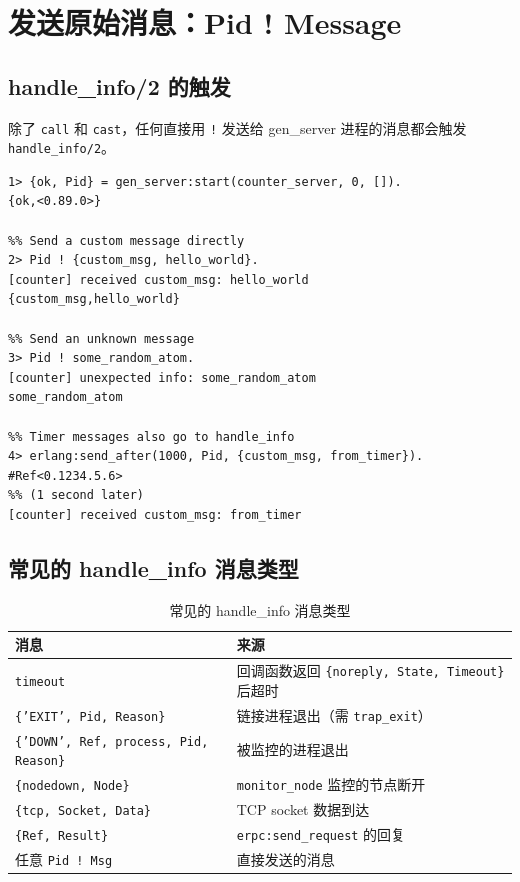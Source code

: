 \documentclass[a4paper,11pt]{article}
\begin{document}
\section{发送原始消息：Pid ! Message}

\subsection{handle\_info/2 的触发}

除了 \texttt{call} 和 \texttt{cast}，任何直接用 \texttt{!} 发送给 gen\_server 进程的消息都会触发 \texttt{handle\_info/2}。

\begin{lstlisting}[style=shellstyle, caption={直接发送消息}]
1> {ok, Pid} = gen_server:start(counter_server, 0, []).
{ok,<0.89.0>}

%% Send a custom message directly
2> Pid ! {custom_msg, hello_world}.
[counter] received custom_msg: hello_world
{custom_msg,hello_world}

%% Send an unknown message
3> Pid ! some_random_atom.
[counter] unexpected info: some_random_atom
some_random_atom

%% Timer messages also go to handle_info
4> erlang:send_after(1000, Pid, {custom_msg, from_timer}).
#Ref<0.1234.5.6>
%% (1 second later)
[counter] received custom_msg: from_timer
\end{lstlisting}

\subsection{常见的 handle\_info 消息类型}

\begin{table}[H]
\centering
\small
\begin{tabular}{@{}lp{7cm}@{}}
\toprule
\textbf{消息} & \textbf{来源} \\
\midrule
\texttt{timeout} & 回调函数返回 \texttt{\{noreply, State, Timeout\}} 后超时 \\
\texttt{\{'EXIT', Pid, Reason\}} & 链接进程退出（需 \texttt{trap\_exit}） \\
\texttt{\{'DOWN', Ref, process, Pid, Reason\}} & 被监控的进程退出 \\
\texttt{\{nodedown, Node\}} & \texttt{monitor\_node} 监控的节点断开 \\
\texttt{\{tcp, Socket, Data\}} & TCP socket 数据到达 \\
\texttt{\{Ref, Result\}} & \texttt{erpc:send\_request} 的回复 \\
任意 \texttt{Pid ! Msg} & 直接发送的消息 \\
\bottomrule
\end{tabular}
\caption{常见的 handle\_info 消息类型}
\end{table}
\end{document}

